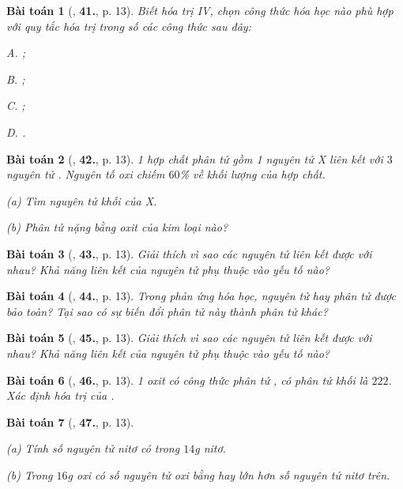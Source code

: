 \documentclass{article}
\numberwithin{equation}{section}
\newtheorem{baitoan}{Bài toán}[section]
\begin{document}
\begin{baitoan}[\cite{An2011}, \textbf{41.}, p. 13]
	Biết  hóa trị IV, chọn công thức hóa học nào phù hợp với quy tắc hóa trị trong số các công thức sau đây:
	\begin{enumerate*}
		\item[{\rm\sf A.}] ;
		\item[{\rm\sf B.}] ;
		\item[{\rm\sf C.}] ;
		\item[{\rm\sf D.}] .
	\end{enumerate*}
\end{baitoan}

\begin{baitoan}[\cite{An2011}, \textbf{42.}, p. 13]
	1 hợp chất phân tử gồm 1 nguyên tử X liên kết với $3$ nguyên tử . Nguyên tố oxi chiếm $60$\% về khối lượng của hợp chất.
	\begin{enumerate*}
		\item[(a)] Tìm nguyên tử khối của X.
		\item[(b)] Phân tử nặng bằng oxit của kim loại nào?
	\end{enumerate*}
\end{baitoan}

\begin{baitoan}[\cite{An2011}, \textbf{43.}, p. 13]
	Giải thích vì sao các nguyên tử liên kết được với nhau? Khả năng liên kết của nguyên tử phụ thuộc vào yếu tố nào?
\end{baitoan}

\begin{baitoan}[\cite{An2011}, \textbf{44.}, p. 13]
	Trong phản ứng hóa học, nguyên tử hay phân tử được bảo toàn? Tại sao có sự biến đổi phân tử này thành phân tử khác?
\end{baitoan}

\begin{baitoan}[\cite{An2011}, \textbf{45.}, p. 13]
	Giải thích vì sao các nguyên tử liên kết được với nhau? Khả năng liên kết của nguyên tử phụ thuộc vào yếu tố nào?
\end{baitoan}

\begin{baitoan}[\cite{An2011}, \textbf{46.}, p. 13]
	1 oxit có công thức phân tử , có phân tử khối là $222$. Xác định hóa trị của \ce{Mn}.
\end{baitoan}

\begin{baitoan}[\cite{An2011}, \textbf{47.}, p. 13]
	\begin{enumerate*}
		\item[(a)] Tính số nguyên tử nitơ có trong $14$g nitơ.
		\item[(b)] Trong $16$g oxi có số nguyên tử oxi bằng hay lớn hơn số nguyên tử nitơ trên.
	\end{enumerate*}
\end{baitoan}
\end{document}
